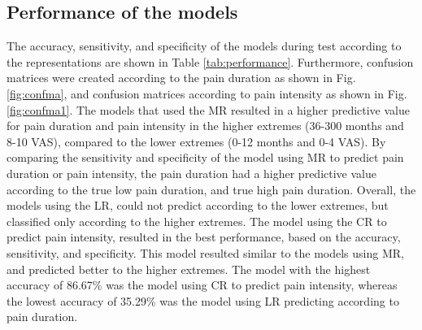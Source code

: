 \subsection{Performance of the models}
The accuracy, sensitivity, and specificity of the models during test according to the representations are shown in Table \ref{tab:performance}. Furthermore, confusion matrices were created according to the pain duration as shown in Fig. \ref{fig:confma}, and confusion matrices according to pain intensity as shown in Fig. \ref{fig:confma1}.
The models that used the MR resulted in a higher predictive value for pain duration and pain intensity in the higher extremes (36-300 months and 8-10 VAS), compared to the lower extremes (0-12 months and 0-4 VAS). By comparing the sensitivity and specificity of the model using MR to predict pain duration or pain intensity, the pain duration had a higher predictive value according to the true low pain duration, and true high pain duration.
Overall, the models using the LR, could not predict according to the lower extremes, but classified only according to the higher extremes.  
The model using the CR to predict pain intensity, resulted in the best performance, based on the accuracy, sensitivity, and specificity. This model resulted similar to the models using MR, and predicted better to the higher extremes. 
The model with the highest accuracy of 86.67\% was the model using CR to predict pain intensity, whereas the lowest accuracy of 35.29\% was the model using LR predicting according to pain duration. 